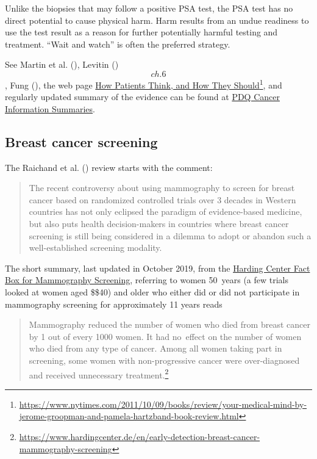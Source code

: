 \documentclass[
  10ptls,
  b5paper]{book}
\begin{document}
Unlike the biopsies that may follow a positive PSA test, the PSA test has no direct potential to cause physical harm. Harm results from an undue readiness to use the test result as a reason for further potentially harmful testing and treatment. ``Wait and watch'' is often the preferred strategy.

See Martin et al. (), Levitin () \[ch. 6\], Fung (), the web page \href{https://www.nytimes.com/2011/10/09/books/review/your-medical-mind-by-jerome-groopman-and-pamela-hartzband-book-review.html}{How Patients Think, and How They Should}\footnote{\url{https://www.nytimes.com/2011/10/09/books/review/your-medical-mind-by-jerome-groopman-and-pamela-hartzband-book-review.html}}, and regularly updated summary of the evidence can be found at \href{https://www.ncbi.nlm.nih.gov/books/NBK65906/}{PDQ Cancer Information Summaries}.

\subsection*{Breast cancer screening}\label{breast-cancer-screening}

The Raichand et al. () review starts with the comment:

\begin{quote}
The recent controversy about using mammography to screen for breast cancer based on randomized controlled trials over 3 decades in Western countries has not only eclipsed the paradigm of evidence-based medicine, but also puts health decision-makers in countries where breast cancer screening is still being considered in a dilemma to adopt or abandon such a well-established screening modality.
\end{quote}

The short summary, last updated in October 2019, from the \href{https://www.hardingcenter.de/en/early-detection-breast-cancer-mammography-screening}{Harding Center Fact Box for Mammography Screening}, referring to women 50~years (a few trials looked at women aged \$\geq\$40) and older who either did or did not participate in mammography screening for approximately 11 years reads

\begin{quote}
Mammography reduced the number of women who died from breast cancer by 1 out of every 1000 women. It had no~effect on the number of women who died from any type of cancer. Among all women taking part in screening, some women with non-progressive cancer were over-diagnosed and received unnecessary treatment.\footnote{\url{https://www.hardingcenter.de/en/early-detection-breast-cancer-mammography-screening}}
\end{quote}
\end{document}
